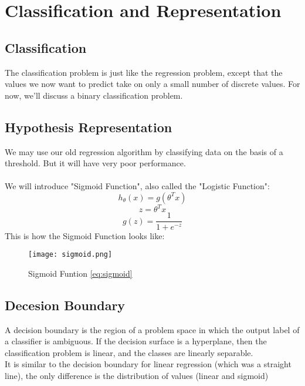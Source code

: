 \section{Classification and Representation}

  \subsection{Classification}
    The classification problem is just like the regression problem, except that the values we now want to predict take on only a small number of discrete values. For now, we'll discuss a binary classification problem.

  \subsection{Hypothesis Representation}
    We may use our old regression algorithm by classifying data on the basis of a threshold. But it will have very poor performance.\\ 
    \\We will introduce "Sigmoid Function", also called the "Logistic Function":
    \begin{equation}
      h_\theta(x) = g(\theta^{T}x)
    \end{equation}
    \begin{equation}
      z = \theta^{T}x
    \end{equation}
    \begin{equation}\label{eq:sigmoid}
      g(z) = \frac{1}{1+e^{-z}}
    \end{equation}
    This is how the Sigmoid Function looks like:
    \begin{figure}[h]
      \centering
      \texttt{[image: sigmoid.png]}
      \caption{Sigmoid Funtion \ref{eq:sigmoid}}
    \end{figure}

  \subsection{Decesion Boundary}
    A decision boundary is the region of a problem space in which the output label of a classifier is ambiguous. If the decision surface is a hyperplane, then the classification problem is linear, and the classes are linearly separable. 
\\
    It is similar to the decision boundary for linear regression (which was a straight line), the only difference is the distribution of values (linear and sigmoid)

